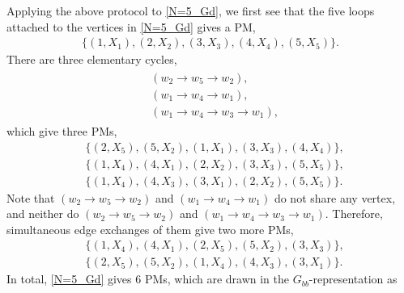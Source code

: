 \documentclass[a4paper,twocolumn,8pt,accepted=2021-12-15]{quantumarticle}
\newcommand{\nn}{\nonumber}
\begin{document}
	
	$ $\\ Applying the above protocol to \eqref{N=5_Gd},
	we first see that the five loops attached to the vertices in \eqref{N=5_Gd} gives a PM, 
	\begin{align}
		\{(1,X_{1}),(2,X_{2}),(3,X_3),(4,X_4),(5,X_{5})\}.
	\end{align}
	There are three elementary cycles, 
	\begin{align}
		\begin{split}
			&(w_2 \to w_5\to w_2), 
			\\
			&(w_1\to w_4\to w_1), 
			\\
			&(w_1\to w_4 \to w_3 \to w_1),
		\end{split}
	\end{align}
	which give three PMs,
	\begin{align}
		&\{(2,X_{5}),(5,X_{2}),(1,X_1),(3,X_3),(4,X_{4})\}, \nn \\ 
		&\{(1,X_{4}),(4,X_{1}),(2,X_2),(3,X_3),(5,X_{5})\},\nn \\ 		&\{(1,X_{4}),(4,X_{3}),(3,X_1),(2,X_2),(5,X_{5})\}.	
	\end{align} 
	Note that $(w_2 \to w_5\to w_2)$ and $(w_1\to w_4\to w_1)$ do not share any vertex,   and neither do $(w_2 \to w_5\to w_2)$ and $(w_1\to w_4 \to w_3 \to w_1)$. Therefore,  simultaneous edge exchanges of them give two more PMs,
	\begin{align}
		&\{(1,X_{4}),(4,X_{1}),(2,X_5),(5,X_2),(3,X_{3})\},\nn \\	&\{(2,X_{5}),(5,X_{2}),(1,X_4),(4,X_3),(3,X_{1})\}.	
	\end{align}
	In total, \eqref{N=5_Gd} gives 6 PMs, which are drawn in the $G_{bb}$-representation as
\end{document}
